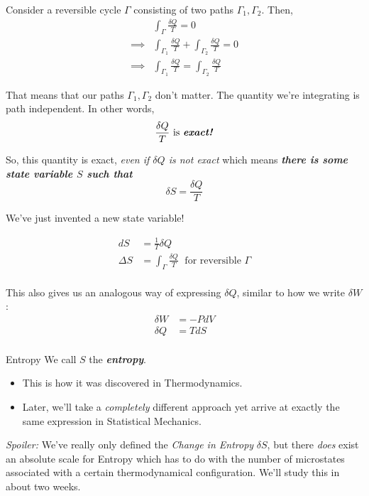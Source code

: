 \documentclass{article}
\begin{document}
Consider a reversible cycle $\Gamma$ consisting of two paths $\Gamma_{1}, \Gamma_{2}$. Then, 
\begin{align*}
  &\int_{\Gamma} \frac{\delta Q}{T} = 0 \\
  \implies & \int_{{\Gamma_{1}}} \frac{\delta Q}{T} + \int_{{\Gamma_{2}}} \frac{\delta Q}{T} = 0 \\
  \implies & \boxed{\int_{{\Gamma_{1}}} \frac{\delta Q}{T} = \int_{{\Gamma_{2}}} \frac{\delta Q}{T}}
\end{align*}

That means that our paths ${\Gamma_{1}}, {\Gamma_{2}}$ don't matter. The quantity we're integrating is path independent. In other words, 
\[ \frac{\delta Q}{T} \text{ is \emph{\textbf{exact!}}}  \]

So, this quantity is exact, \emph{even if $\delta Q$ is not exact} which means \emph{\textbf{there is some state variable $S$ such that}}
\[ \delta S = \frac{\delta Q}{T} \]

\vskip 0.25cm
We've just invented a new state variable!

\begin{align*}
  dS &= \frac{1}{T} \delta Q \\
  \Delta S &= \int_{\Gamma} \frac{\delta Q}{T} \;\text{ for reversible } \Gamma \\
\end{align*}

This also gives us an analogous way of expressing $\delta Q$, similar to how we write $\delta W$:
\begin{align*}
  \delta W &= -P dV \\
  \delta Q &= T dS \\
\end{align*}

\begin{mathdefinitionbox}{Entropy}
  \vskip 0.25cm
  We call $S$ the \emph{\textbf{entropy}}.
  \begin{itemize}
    \item This is how it was discovered in Thermodynamics.
    \item Later, we'll take a \emph{completely} different approach yet arrive at exactly the same expression in Statistical Mechanics.
  \end{itemize}
\end{mathdefinitionbox}

\begin{dottedbox}
  \emph{Spoiler:} We've really only defined the \emph{Change in Entropy} $\delta S$, but there \emph{does} exist an absolute scale for Entropy which has to do with the number of microstates associated with a certain thermodynamical configuration.
  We'll study this in about two weeks.
\end{dottedbox}
\end{document}
